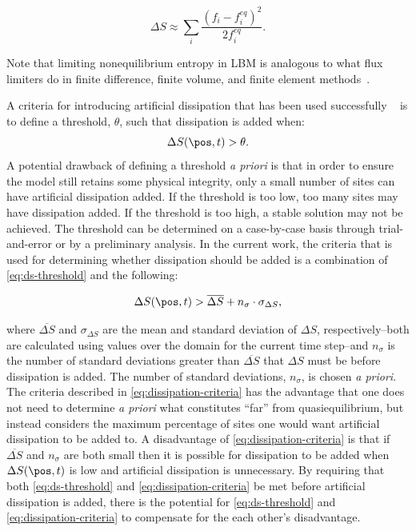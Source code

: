 \begin{equation} \label{eq:quadratic-entropy}
\Delta S \approx \sum_i \frac{(f_i - f^{eq}_i)^2}{2f^{eq}_i}.
\end{equation}

\noindent Note that limiting nonequilibrium entropy in LBM is analogous to what flux limiters do in finite difference, finite volume, and finite element methods~\cite{brownlee2008nonequilibrium}.

A criteria for introducing artificial dissipation that has been used successfully ~\cite{gorban2014enhancement,brownlee2006stabilization,brownlee2007stability,brownlee2008nonequilibrium} is to define a threshold, $\theta$, such that dissipation is added when:
\begin{equation} \label{eq:ds-threshold}
  \Delta S(\pos, t) > \theta.
\end{equation}
A potential drawback of defining a threshold \textit{a priori} is that in order to ensure the model still retains some physical integrity, only a small number of sites can have artificial dissipation added.
If the threshold is too low, too many sites may have dissipation added.
If the threshold is too high, a stable solution may not be achieved.
The threshold can be determined on a case-by-case basis through trial-and-error or by a preliminary analysis.
In the current work, the criteria that is used for determining whether dissipation should be added is a combination of \eqref{eq:ds-threshold} and the following:

\begin{equation} \label{eq:dissipation-criteria}
  \Delta S(\pos, t) > \overline{\Delta S} + n_\sigma \cdot \sigma_{\Delta S},
\end{equation}

\noindent where $\overline{\Delta S}$ and $\sigma_{\Delta S}$ are the mean and standard deviation of $\Delta S$, respectively--both are calculated using values over the domain for the current time step--and $n_\sigma$ is the number of standard deviations greater than $\overline{\Delta S}$ that $\Delta S$ must be before dissipation is added.
The number of standard deviations, $n_\sigma$, is chosen \textit{a priori}.
The criteria described in \eqref{eq:dissipation-criteria} has the advantage that one does not need to determine \textit{a priori} what constitutes ``far'' from quasiequilibrium, but instead considers the maximum percentage of sites one would want artificial dissipation to be added to.
A disadvantage of \eqref{eq:dissipation-criteria} is that if $\overline{\Delta S}$ and $n_\sigma$ are both small then it is possible for dissipation to be added when $\Delta S(\pos, t)$ is low and artificial dissipation is unnecessary.
By requiring that both \eqref{eq:ds-threshold} and \eqref{eq:dissipation-criteria} be met before artificial dissipation is added, there is the potential for \eqref{eq:ds-threshold} and \eqref{eq:dissipation-criteria} to compensate for the each other's disadvantage.

